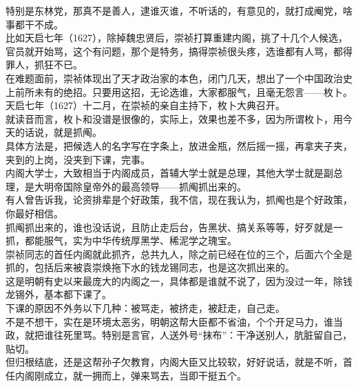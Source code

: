 \begin{multicols}{\theparacolNo}
特别是东林党，那真不是善人，逮谁灭谁，不听话的，有意见的，就打成阉党，啥事都干不成。\\

比如天启七年（1627），除掉魏忠贤后，崇祯打算重建内阁，挑了十几个人候选，官员就开始骂，这个有问题，那个是特务，搞得崇祯很头疼，选谁都有人骂，都得罪人，抓狂不已。\\

在难题面前，崇祯体现出了天才政治家的本色，闭门几天，想出了一个中国政治史上前所未有的绝招。只要用这招，无论选谁，大家都服气，且毫无怨言——枚卜。\\

天启七年（1627）十二月，在崇祯的亲自主持下，枚卜大典召开。\\

就读音而言，枚卜和没谱是很像的，实际上，效果也差不多，因为所谓枚卜，用今天的话说，就是抓阄。\\

具体方法是，把候选人的名字写在字条上，放进金瓶，然后摇一摇，再拿夹子夹，夹到的上岗，没夹到下课，完事。\\

内阁大学士，大致相当于内阁成员，首辅大学士就是总理，其他大学士就是副总理，是大明帝国除皇帝外的最高领导——抓阄抓出来的。\\

有人曾告诉我，论资排辈是个好政策，我不信，现在我认为，抓阄也是个好政策，你最好相信。\\

抓阄抓出来的，谁也没话说，且防止走后台，告黑状、搞关系等等，好歹就是一抓，都能服气，实为中华传统厚黑学、稀泥学之瑰宝。\\

崇祯同志的首任内阁就此抓齐，总共九人，除之前已经在位的三个，后面六个全是抓的，包括后来被袁崇焕拖下水的钱龙锡同志，也是这次抓出来的。\\

这是明朝有史以来最庞大的内阁之一，具体都是谁就不说了，因为没过一年，除钱龙锡外，基本都下课了。\\

下课的原因不外务以下几种：被骂走，被挤走，被赶走，自己走。\\

不是不想干，实在是环境太恶劣，明朝这帮大臣都不省油，个个开足马力，谁当政，就把谁往死里骂。特别是言官，人送外号“抹布”：干净送别人，肮脏留自己，贴切。\\

但归根结底，还是这帮孙子欠教育，内阁大臣又比较软，好好说话，就是不听，首任内阁刚成立，就一拥而上，弹来骂去，当即干挺五个。\\


\end{multicols}
